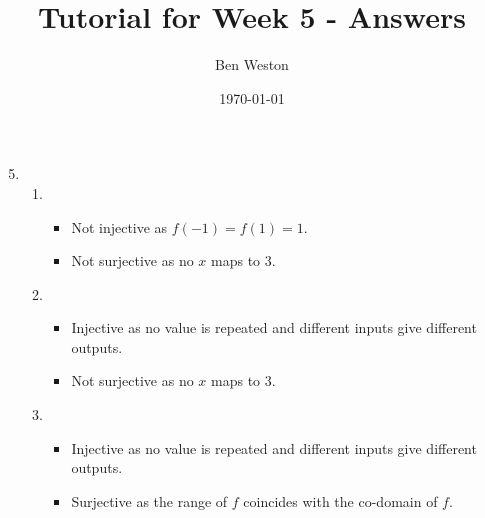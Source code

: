 \documentclass{article}
\title{Tutorial for Week 5 - Answers}
\author{Ben Weston}
\date{\today}
\begin{document}
\maketitle
\begin{enumerate}\setcounter{enumi}{4}
        \item{
                        \begin{enumerate}
                                \item{ 
                                                \begin{itemize}
                                                        \item Not injective as $f(-1)=f(1)=1$.
                                                        \item Not surjective as no $x$ maps to 3.
                                                \end{itemize}
                                        }
                                \item{
                                                \begin{itemize}
                                                        \item Injective as no value is repeated and different inputs give different outputs.
                                                        \item Not surjective as no $x$ maps to 3.
                                                \end{itemize}
                                        }
                                \item{
                                                \begin{itemize}
                                                        \item Injective as no value is repeated and different inputs give different outputs.
                                                        \item Surjective as the range of $f$ coincides with the co-domain of $f$.
                                                \end{itemize}
                                        }
                        \end{enumerate}
                }
\end{enumerate}
\end{document}
